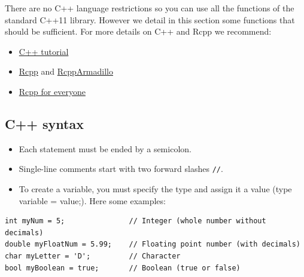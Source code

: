 There are no C++ language restrictions so you can use all the functions of the standard C++11 library. However we detail in this section some functions that should be sufficient. For more details on C++ and Rcpp we recommend:

\begin{itemize}
\tightlist
\item
  \href{https://www.cplusplus.com/doc/tutorial/}{C++ tutorial}
\item
  \href{http://dirk.eddelbuettel.com/code/rcpp.html}{Rcpp} and \href{http://dirk.eddelbuettel.com/code/rcpp.armadillo.html}{RcppArmadillo}
\item
  \href{https://teuder.github.io/rcpp4everyone_en/}{Rcpp for everyone}
\end{itemize}

\hypertarget{c-syntax}{%
\subsection{C++ syntax}\label{c-syntax}}

\begin{itemize}
\tightlist
\item
  Each statement must be ended by a semicolon.
\item
  Single-line comments start with two forward slashes \texttt{//}.
\item
  To create a variable, you must specify the type and assign it a value (type variable = value;). Here some examples:
\end{itemize}

\begin{verbatim}
int myNum = 5;               // Integer (whole number without decimals)
double myFloatNum = 5.99;    // Floating point number (with decimals)
char myLetter = 'D';         // Character
bool myBoolean = true;       // Boolean (true or false)
\end{verbatim}

